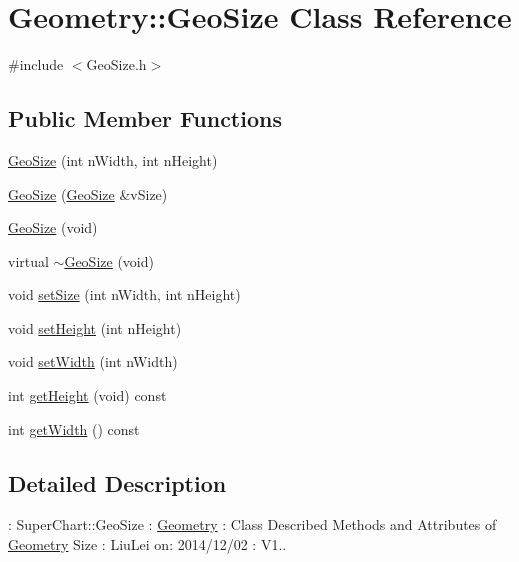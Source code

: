 \hypertarget{class_geometry_1_1_geo_size}{\section{Geometry\+:\+:Geo\+Size Class Reference}
\label{class_geometry_1_1_geo_size}
}


{\ttfamily \#include $<$Geo\+Size.\+h$>$}

\subsection*{Public Member Functions}
\begin{DoxyCompactItemize}
\item 
\hyperlink{class_geometry_1_1_geo_size_a49ff629e779cf2915f2ab6db76fdbd88}{Geo\+Size} (int n\+Width, int n\+Height)
\item 
\hyperlink{class_geometry_1_1_geo_size_a1c3e2135dc690464ee971fbb46580d1a}{Geo\+Size} (\hyperlink{class_geometry_1_1_geo_size}{Geo\+Size} \&v\+Size)
\item 
\hyperlink{class_geometry_1_1_geo_size_aa16a3b5494af1e8cf70cf4fd8aba8671}{Geo\+Size} (void)
\item 
virtual \hyperlink{class_geometry_1_1_geo_size_a679d627f4055584b54d62db8d0fd27e6}{$\sim$\+Geo\+Size} (void)
\item 
void \hyperlink{class_geometry_1_1_geo_size_aec253e3e476eb610ed158edfa73dad6c}{set\+Size} (int n\+Width, int n\+Height)
\item 
void \hyperlink{class_geometry_1_1_geo_size_ade8cf6cde2437dfc613fa195381d0b80}{set\+Height} (int n\+Height)
\item 
void \hyperlink{class_geometry_1_1_geo_size_ad58e522fe929007d04db32e7b6b255a2}{set\+Width} (int n\+Width)
\item 
int \hyperlink{class_geometry_1_1_geo_size_a83b38c90839aea314d1bac712ea55ad0}{get\+Height} (void) const 
\item 
int \hyperlink{class_geometry_1_1_geo_size_a95124017274175ba8971dedb4d8255a6}{get\+Width} () const 
\end{DoxyCompactItemize}


\subsection{Detailed Description}
\+: Super\+Chart\+::\+Geo\+Size \+: \hyperlink{namespace_geometry}{Geometry} \+: Class Described Methods and Attributes of \hyperlink{namespace_geometry}{Geometry} Size \+: Liu\+Lei  on\+: 2014/12/02 \+: V1.. 

